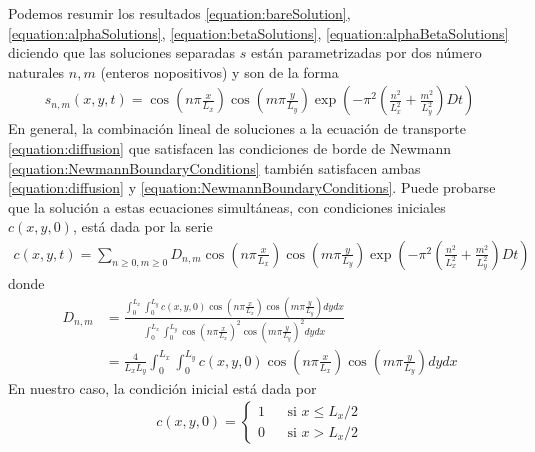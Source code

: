 \documentclass{article}
\begin{document}
  Podemos resumir los resultados
  \eqref{equation:bareSolution}, \eqref{equation:alphaSolutions}, \eqref{equation:betaSolutions}, \eqref{equation:alphaBetaSolutions}
  diciendo que las soluciones separadas \(s\) están parametrizadas por dos número naturales \(n, m\) (enteros nopositivos) y son de la forma
  \begin{align}
    \label{equation:totalSolution}
    s_{n, m}(x, y, t)
    =
    \cos\left( n \pi \frac{x}{L_x} \right)
    \cos\left( m \pi \frac{y}{L_y} \right)
    \exp\left( - \pi^2 \left( \frac{n^2}{L_x^2} + \frac{m^2}{L_y^2} \right) D t \right)
  \end{align}
  En general, la combinación lineal de soluciones a la ecuación de transporte \eqref{equation:diffusion} que satisfacen las condiciones de borde de Newmann \eqref{equation:NewmannBoundaryConditions} también satisfacen ambas \eqref{equation:diffusion} y \eqref{equation:NewmannBoundaryConditions}.
  Puede probarse que la solución a estas ecuaciones simultáneas, con condiciones iniciales \(c(x, y, 0)\), está dada por la serie
  \begin{align}
    c(x, y, t)
    =
    \sum_{n \geq 0, m \geq 0}
    D_{n, m}
    \cos\left( n \pi \frac{x}{L_x} \right)
    \cos\left( m \pi \frac{y}{L_y} \right)
    \exp\left( - \pi^2 \left( \frac{n^2}{L_x^2} + \frac{m^2}{L_y^2} \right) D t \right)
  \end{align}
  donde
  \begin{align}
    D_{n, m}
    &=
    \frac{
      \int_0^{L_x}
        \int_0^{L_y}
          c(x, y, 0)
          \cos\left( n \pi \frac{x}{L_x} \right)
          \cos\left( m \pi \frac{y}{L_y} \right)
        d y
      d x
    }{
      \int_0^{L_x}
        \int_0^{L_y}
        \cos\left( n \pi \frac{x}{L_x} \right)^2
        \cos\left( m \pi \frac{y}{L_y} \right)^2
        d y
      d x
    }
    \\
    &=
    \frac{4}{L_x L_y} 
    \int_0^{L_x}
      \int_0^{L_y}
        c(x, y, 0)
        \cos\left( n \pi \frac{x}{L_x} \right)
        \cos\left( m \pi \frac{y}{L_y} \right)
      d y
    d x
  \end{align}
  En nuestro caso, la condición inicial está dada por 
  \begin{align}
    \label{equation:initialCondition}
    c(x, y, 0)
    =
    \left\{
      \begin{aligned}
        1 &&\text{si } x \leq L_x /2 \\
        0 &&\text{si } x > L_x / 2
      \end{aligned}
    \right.
  \end{align}
\end{document}
